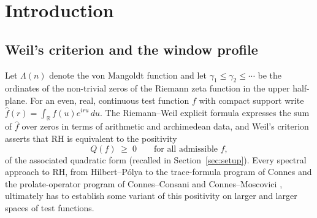 ﻿\documentclass[11pt]{article}
\newcommand{\R}{\mathbb{R}}
\newcommand{\lmin}{\lambda^{*}}
\newcommand{\fhat}{\hat f}
\begin{document}
\begin{abstract}
\emph{Synthesis.}  At $L=0.8$ the two halves meet and enclose the
profile from both sides,
$8.9\times10^{-18}\le\lmin(0.8)\le2.27\times10^{-17}$, with
\emph{unconditional} certificates for both inequalities.  The same computations show why
the positivity route cannot reach RH unassisted.  Any certificate of
the one-stroke type must resolve frequencies up to
$T_1(L)=2\pi e^{A_L}$, where $A_L\sim4e^{L}$ is the mass of the prime
comb; this threshold grows doubly exponentially in $L$, and we show
that no pointwise bound on the comb lowers it.  Meanwhile the
available spectral margin collapses at the matching Landau--Widom
rate.  Passing the resulting wall thus requires cancellation in the
prime comb, a concrete arithmetic problem.  Finally, we document how
float64 evaluations of the geometric side produce spurious negative
eigenvalues, a trap for any numerical study of Weil positivity, and
give a certified remedy.
\end{abstract}

\section{Introduction}\label{sec:intro}

\subsection{Weil's criterion and the window profile}

Let $\Lambda(n)$ denote the von Mangoldt function and let
$\gamma_1\le\gamma_2\le\cdots$ be the ordinates of the non-trivial
zeros of the Riemann zeta function in the upper half-plane.  For an
even, real, continuous test function $f$ with compact support write
$\fhat(r)=\int_{\R}f(u)e^{iru}\,du$.  The Riemann--Weil explicit
formula expresses the sum of $\fhat$ over zeros in terms of arithmetic
and archimedean data, and Weil's criterion \cite{Weil1952,Bombieri2000}
asserts that RH is equivalent to the positivity
\[
  Q(f)\;\ge\;0 \qquad\text{for all admissible } f,
\]
of the associated quadratic form (recalled in
Section~\ref{sec:setup}).  Every spectral approach to RH, from
Hilbert--P\'olya to the trace-formula program of Connes
\cite{Connes1999} and the prolate-operator program of Connes--Consani
and Connes--Moscovici \cite{ConnesConsani2021,ConnesMoscovici2022},
ultimately has to establish some variant of this positivity on larger
and larger spaces of test functions.
\end{document}
